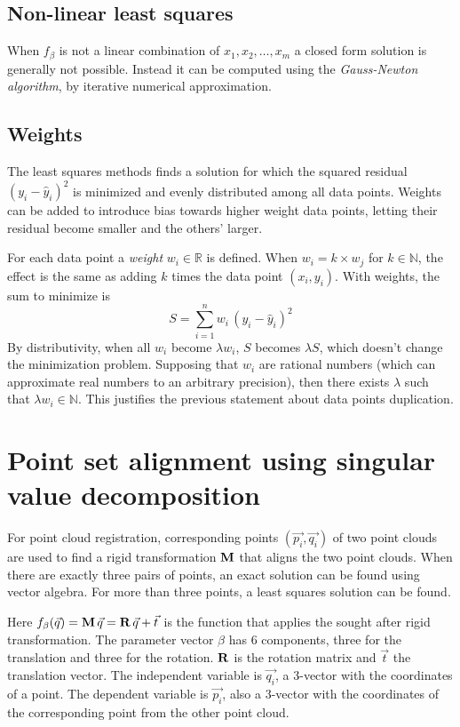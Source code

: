 \subsection{Non-linear least squares}
When $f_{\beta}$ is not a linear combination of $x_1, x_2, \dots, x_m$ a closed form solution is generally not possible. Instead it can be computed using the \emph{Gauss-Newton algorithm}, by iterative numerical approximation.

\subsection{Weights}
The least squares methods finds a solution for which the squared residual $(y_i - \hat{y}_i)^2$ is minimized and evenly distributed among all data points. Weights can be added to introduce bias towards higher weight data points, letting their residual become smaller and the others' larger.

For each data point a \emph{weight} $w_i \in \mathds{R}$ is defined. When $w_i = k \times w_j$ for $k \in \mathds{N}$, the effect is the same as adding $k$ times the data point $(x_i, y_i)$. With weights, the sum to minimize is
\begin{equation}
S = \sum_{i=1}^{n} w_i \, (y_i - \hat{y}_i)^2
\end{equation}
By distributivity, when all $w_i$ become $\lambda w_i$, $S$ becomes $\lambda S$, which doesn't change the minimization problem. Supposing that $w_i$ are rational numbers (which can approximate real numbers to an arbitrary precision), then there exists $\lambda$ such that $\lambda w_i \in \mathds{N}$. This justifies the previous statement about data points duplication. 

\section{Point set alignment using singular value decomposition} \label{sec:lsq_align}
For point cloud registration, corresponding points $(\vec{p_i}, \vec{q_i})$ of two point clouds are used to find a rigid transformation $\mathbf{M}$ that aligns the two point clouds. When there are exactly three pairs of points, an exact solution can be found using vector algebra. \cite{Horn1986} For more than three points, a least squares solution can be found.

Here $f_{\beta}(\vec{q}) = \mathbf{M} \, \vec{q} = \mathbf{R} \, \vec{q} + \vec{t}$ is the function that applies the sought after rigid transformation. The parameter vector $\beta$ has 6 components, three for the translation and three for the rotation. $\mathbf{R}$ is the rotation matrix and $\vec{t}$ the translation vector. The independent variable is $\vec{q_i}$, a 3-vector with the coordinates of a point. The dependent variable is $\vec{p_i}$, also a 3-vector with the coordinates of the corresponding point from the other point cloud.


